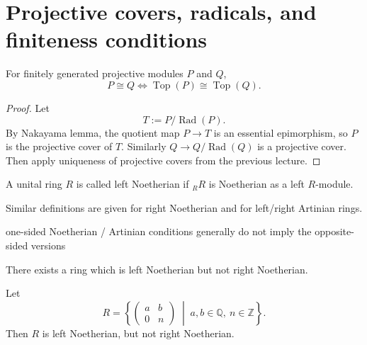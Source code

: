 \section{Projective covers, radicals, and finiteness conditions}

\begin{corollary}
    For finitely generated projective modules $P$ and $Q$,
    \[
        P\cong Q
        \Longleftrightarrow
        \operatorname{Top}(P)\cong \operatorname{Top}(Q).
    \]
\end{corollary}

\begin{proof}
    Let
    \[
        T := P/\operatorname{Rad}(P).
    \]
    By Nakayama lemma, the quotient map $P \to T$ is an essential epimorphism, so $P$ is the projective cover of $T$.
    Similarly $Q \to Q/\operatorname{Rad}(Q)$ is a projective cover.
    Then apply uniqueness of projective covers from the previous lecture.
\end{proof}

\begin{definition}
    A unital ring $R$ is called left Noetherian if ${}_R R$ is Noetherian as a left $R$-module.
\end{definition}

\begin{remark}
    Similar definitions are given for right Noetherian and for left/right Artinian rings.
\end{remark}

\begin{remark}
    one-sided Noetherian / Artinian conditions generally do not imply the opposite-sided versions
\end{remark}

\begin{example}
    There exists a ring which is left Noetherian but not right Noetherian.

    Let
    \[
        R=
        \left\{
        \begin{pmatrix}
            a & b \\
            0 & n
        \end{pmatrix}
        \;\middle|\;
        a,b\in \mathbb{Q},\ n\in \mathbb{Z}
        \right\}.
    \]
    Then $R$ is left Noetherian, but not right Noetherian.
\end{example}

